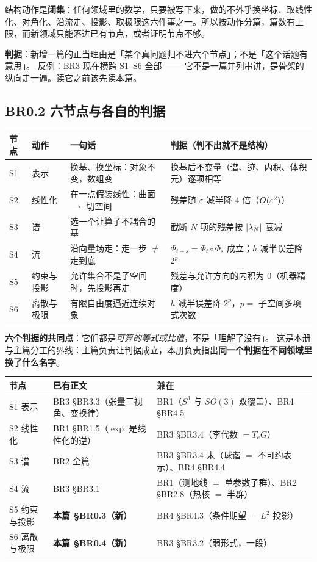 结构动作是\textbf{闭集}：任何领域里的数学，只要被写下来，做的不外乎换坐标、取线性化、对角化、沿流走、投影、取极限这六件事之一。所以按动作分篇，篇数有上限，而新领域只能落进已有节点，或者证明节点不够。

\textbf{判据}：新增一篇的正当理由是「某个真问题归不进六个节点」；不是「这个话题有意思」。
反例：BR3 现在横跨 S1–S6 全部 —— 它不是一篇并列串讲，是骨架的纵向走一遍。读它之前该先读本篇。

\subsection{BR0.2 六节点与各自的判据}

\begin{center}
\small
\begin{tabular}{L{2.1cm}L{2.1cm}L{5.2cm}L{4.4cm}}
\toprule
\textbf{节点} & \textbf{动作} & \textbf{一句话} & \textbf{判据（判不出就不是结构）} \\
\midrule
S1 & 表示 & 换基、换坐标：对象不变，数组变 & 换基后不变量（谱、迹、内积、体积元）逐项相等 \\
S2 & 线性化 & 在一点假装线性：曲面 $\to$ 切空间 & 残差随 $\varepsilon$ 减半降 4 倍（$O(\varepsilon^{2})$）\\
S3 & 谱 & 选一个让算子不耦合的基 & 截断 $N$ 项的残差按 $\left\lvert \lambda_N\right\rvert$ 衰减 \\
S4 & 流 & 沿向量场走：走一步 $\ne$ 走到底 & $\Phi_{t+s}=\Phi_t\circ\Phi_s$ 成立；$h$ 减半误差降 $2^{p}$ \\
S5 & 约束与投影 & 允许集合不是子空间时，先投影再走 & 残差与允许方向的内积为 $0$（机器精度）\\
S6 & 离散与极限 & 有限自由度逼近连续对象 & $h$ 减半误差降 $2^{p}$，$p=$ 子空间多项式次数 \\
\bottomrule
\end{tabular}
\end{center}

\textbf{六个判据的共同点}：它们都是\emph{可算的等式或比值}，不是「理解了没有」。
这是本册与主篇分工的界线：主篇负责让判据成立，本册负责指出\textbf{同一个判据在不同领域里换了什么名字}。

\begin{center}
\small
\begin{tabular}{L{2.1cm}L{5.6cm}L{5.2cm}}
\toprule
\textbf{节点} & \textbf{已有正文} & \textbf{兼在} \\
\midrule
S1 表示 & BR3 §BR3.3（张量三视角、变换律） & BR1（$S^{3}$ 与 $SO(3)$ 双覆盖）、BR4 §BR4.5 \\
S2 线性化 & BR1 §BR1.5（$\exp$ 是线性化的逆） & BR3 §BR3.4（李代数 $=T_eG$）\\
S3 谱 & BR2 全篇 & BR3 §BR3.4 末（球谐 $=$ 不可约表示）、BR4 §BR4.4 \\
S4 流 & BR3 §BR3.1 & BR1（测地线 $=$ 单参数子群）、BR2 §BR2.8（热核 $=$ 半群）\\
S5 约束与投影 & \textbf{本篇 §BR0.3（新）} & BR4 §BR4.3（条件期望 $=L^{2}$ 投影）\\
S6 离散与极限 & \textbf{本篇 §BR0.4（新）} & BR3 §BR3.2（弱形式，一段）\\
\bottomrule
\end{tabular}
\end{center}

